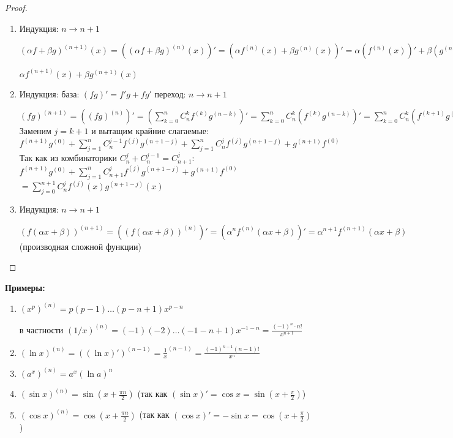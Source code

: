 \begin{proof}
    \
    \begin{enumerate}
        \item Индукция: $n \longrightarrow n+1$
        
        $(\alpha f + \beta g)^{(n+1)}(x) = ((\alpha f + \beta g)^{(n)} (x))' = 
        (\alpha f^{(n)}(x) + \beta g^{(n)}(x))' = \alpha (f^{(n)}(x))' + \beta (g^{(n)}(x))' =$
        
        $\alpha f^{(n+1)}(x) + \beta g^{(n+1)}(x)$

        \item Индукция: база: $(fg)' = f'g + fg'$ \quad переход: $n \longrightarrow n+1$
        
        $(fg)^{(n+1)} = ((fg)^{(n)})' = (\sum\limits_{k=0}^{n} C_n^k f^{(k)} g^{(n-k)})' = 
        \sum\limits_{k=0}^{n} C_n^k (f^{(k)} g^{(n-k)})' = \sum\limits_{k=0}^{n} C_n^k (f^{(k + 1)} g^{(n-k)} + f^{(k)} g^{(n-k+1)}) =
        \sum\limits_{k=0}^{n} C_n^k f^{(k+1)} g^{(n-k)} + \sum\limits_{j=0}^{n} C_n^j f^{(j)} g^{(n-j+1)}$\\
        Заменим $j= k+1$ и вытащим крайние слагаемые: $f^{(n+1)}g^{(0)} + \sum\limits_{j=1}^{n} C_n^{j-1} f^{(j)} g^{(n+1-j)} + \sum\limits_{j=1}^{n} C_n^j f^{(j)} g^{(n+1-j)} + g^{(n+1)}f^{(0)}$\\
        Так как из комбинаторики $C_n^j + C_n^{j-1} = C_{n+1}^j$: $f^{(n+1)}g^{(0)} + \sum\limits_{j=1}^{n} C_{n+1}^j f^{(j)} g^{(n+1-j)} + g^{(n+1)}f^{(0)}$\\
        $= \sum\limits_{j=0}^{n+1} C_n^j f^{(j)}(x) g^{(n+1-j)} (x)$

        \item Индукция: $n \longrightarrow n+1$
        
        $(f(\alpha x + \beta))^{(n+1)} = ((f(\alpha x + \beta))^{(n)})' = (\alpha^n f^{(n)}(\alpha x + \beta))' = 
        \alpha^{n+1} f^{(n+1)}(\alpha x + \beta)$ (производная сложной функции)

    \end{enumerate}
\end{proof}

\textbf{Примеры:}

\begin{enumerate}
    \item $(x^p)^{(n)} = p(p-1) \dots (p-n+1) x^{p-n}$
    
    в частности $(1/x)^{(n)} = (-1)(-2) \dots (-1-n+1) x^{-1-n} = \frac{(-1)^n \cdot n!}{x^{n+1}}$

    \item $(\ln x)^{(n)} = ((\ln x)')^{(n-1)} = \frac{1}{x}^{(n-1)} = \frac{(-1)^{n-1} (n-1)!}{x^n}$
    \item $(a^x)^{(n)} = a^x (\ln a)^n$
    \item $(\sin x)^{(n)} = \sin(x + \frac{\pi n}{2})$ (так как $(\sin x)' = \cos x = \sin (x + \frac{\pi}{2})$)
    \item $(\cos x)^{(n)} = \cos(x + \frac{\pi n}{2})$ (так как $(\cos x)' = -\sin x = \cos (x + \frac{\pi}{2})$)
\end{enumerate}

